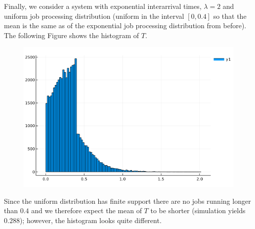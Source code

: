 Finally, we consider a system with exponential interarrival times, $\lambda = 2$ and uniform job processing distribution (uniform in the interval $[0,0.4]$ so that the mean is the same as of the exponential job processing distribution from before). The following Figure shows the histogram of $T$.

\begin{figure}[hbt!]
\centering
\includegraphics[scale=0.4]{images/queuing_3_2.png}
\end{figure}

Since the uniform distribution has finite support there are no jobs running longer than $0.4$ and we therefore expect the mean of $T$ to be shorter (simulation yields $0.288$); however, the histogram looks quite different.

